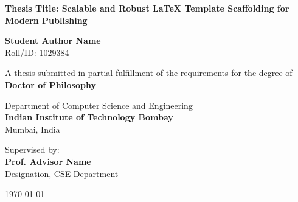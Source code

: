 \begin{titlepage}
\begin{center}
    \vspace*{1cm}
    
    
    \vspace{1.5cm}
    
    {\huge \bfseries \color{primary} Thesis Title: Scalable and Robust LaTeX Template Scaffolding for Modern Publishing}
    
    \vspace{1.5cm}
    
    {\Large \bfseries Student Author Name} \\
    \vspace{0.2cm}
    {Roll/ID: 1029384}
    
    \vspace{1.5cm}
    
    {A thesis submitted in partial fulfillment of the requirements for the degree of} \\
    \vspace{0.3cm}
    {\large \bfseries \color{secondary} Doctor of Philosophy}
    
    \vspace{1.5cm}
    
    {\large Department of Computer Science and Engineering} \\
    \vspace{0.2cm}
    {\large \bfseries \color{primary} Indian Institute of Technology Bombay} \\
    \vspace{0.1cm}
    {Mumbai, India}
    
    \vfill
    
    {Supervised by:} \\
    {\large \bfseries Prof. Advisor Name} \\
    {Designation, CSE Department}
    
    \vspace{1cm}
    
    {\large \today}
    
\end{center}
\end{titlepage}
